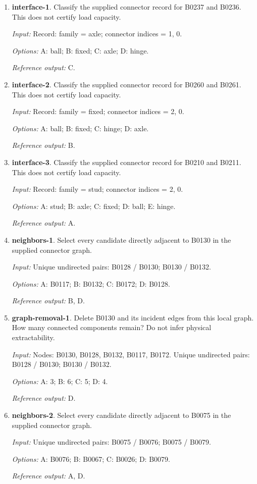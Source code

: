 \begin{enumerate}
\item \textbf{interface-1}. Classify the supplied connector record for B0237 and B0236. This does not certify load capacity.\par {\small \textit{Input:} Record: family = axle; connector indices = 1, 0. \par\textit{Options:} A: ball; B: fixed; C: axle; D: hinge. \par\textit{Reference output:} C.}
\item \textbf{interface-2}. Classify the supplied connector record for B0260 and B0261. This does not certify load capacity.\par {\small \textit{Input:} Record: family = fixed; connector indices = 2, 0. \par\textit{Options:} A: ball; B: fixed; C: hinge; D: axle. \par\textit{Reference output:} B.}
\item \textbf{interface-3}. Classify the supplied connector record for B0210 and B0211. This does not certify load capacity.\par {\small \textit{Input:} Record: family = stud; connector indices = 2, 0. \par\textit{Options:} A: stud; B: axle; C: fixed; D: ball; E: hinge. \par\textit{Reference output:} A.}
\item \textbf{neighbors-1}. Select every candidate directly adjacent to B0130 in the supplied connector graph.\par {\small \textit{Input:} Unique undirected pairs: B0128 / B0130; B0130 / B0132. \par\textit{Options:} A: B0117; B: B0132; C: B0172; D: B0128. \par\textit{Reference output:} B, D.}
\item \textbf{graph-removal-1}. Delete B0130 and its incident edges from this local graph. How many connected components remain? Do not infer physical extractability.\par {\small \textit{Input:} Nodes: B0130, B0128, B0132, B0117, B0172. Unique undirected pairs: B0128 / B0130; B0130 / B0132. \par\textit{Options:} A: 3; B: 6; C: 5; D: 4. \par\textit{Reference output:} D.}
\item \textbf{neighbors-2}. Select every candidate directly adjacent to B0075 in the supplied connector graph.\par {\small \textit{Input:} Unique undirected pairs: B0075 / B0076; B0075 / B0079. \par\textit{Options:} A: B0076; B: B0067; C: B0026; D: B0079. \par\textit{Reference output:} A, D.}

\end{enumerate}
